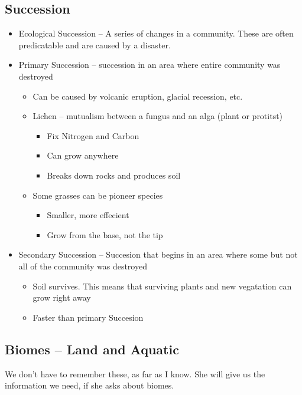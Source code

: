 \documentclass{article}
\begin{document}
\subsection{Succession}
\begin{itemize}
\item Ecological Succession -- A series of changes in a community. These are often predicatable and are caused by a disaster.
\item Primary Succession -- succession in an area where entire community was destroyed
\begin{itemize}
\item Can be caused by volcanic eruption, glacial recession, etc.
\item Lichen -- mutualism between a fungus and an alga (plant or protitst)
\begin{itemize}
\item Fix Nitrogen and Carbon
\item Can grow anywhere
\item Breaks down rocks and produces soil
\end{itemize}
\item Some grasses can be pioneer species
\begin{itemize}
\item Smaller, more effecient
\item Grow from the base, not the tip
\end{itemize}
\end{itemize}
\item Secondary Succession -- Succesion that begins in an area where some but not all of the community was destroyed
\begin{itemize}
\item Soil survives. This means that surviving plants and new vegatation can grow right away
\item Faster than primary Succesion
\end{itemize}
\end{itemize}

\subsection{Biomes -- Land and Aquatic}
We don't have to remember these, as far as I know.
She will give us the information we need, if she asks about biomes.
\end{document}
